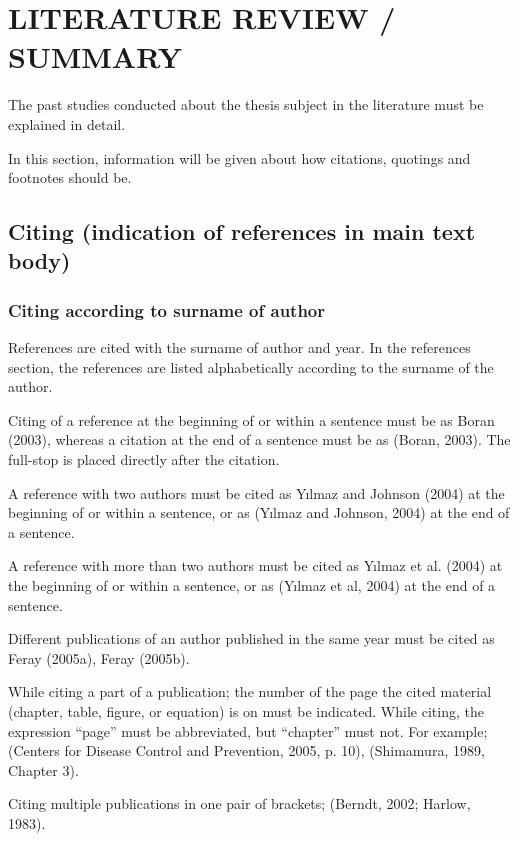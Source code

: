 \chapter{LITERATURE REVIEW / SUMMARY}\label{Ch4}

The past studies conducted about the thesis subject in the literature must be explained in detail.  

In this section, information will be given about how citations, quotings and footnotes should be.

\section{Citing (indication of references in main text body)}

\subsection{Citing according to surname of author}

References are cited with the surname of author and year. In the references section, the references are listed alphabetically according to the surname of the author.

Citing of a reference at the beginning of or within a sentence must be as Boran (2003), whereas a citation at the end of a sentence must be as (Boran, 2003). The full-stop is placed directly after the citation.
 
A reference with two authors must be cited as Yılmaz and Johnson (2004) at the beginning of or within a sentence, or as (Yılmaz and Johnson, 2004) at the end of a sentence. 

A reference with more than two authors must be cited as Yılmaz et al. (2004) at the beginning of or within a sentence, or as (Yılmaz et al, 2004) at the end of a sentence. 

Different publications of an author published in the same year must be cited as Feray (2005a), Feray (2005b). 

While citing a part of a publication; the number of the page the cited material (chapter, table, figure, or equation) is on must be indicated. While citing, the expression “page” must be abbreviated, but “chapter” must not. For example; (Centers for Disease Control and Prevention, 2005, p. 10), (Shimamura, 1989, Chapter 3). 

Citing multiple publications in one pair of brackets; (Berndt, 2002; Harlow, 1983). 

